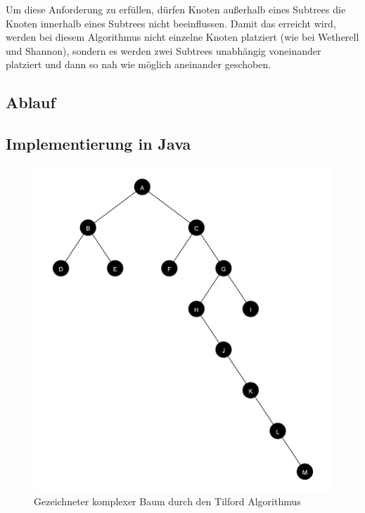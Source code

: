 Um diese Anforderung zu erfüllen, dürfen Knoten außerhalb eines Subtrees die Knoten innerhalb eines Subtrees nicht beeinflussen. 
Damit das erreicht wird, werden bei diesem Algorithmus nicht einzelne Knoten platziert (wie bei Wetherell und Shannon), 
sondern es werden zwei Subtrees unabhängig voneinander platziert und dann so nah wie möglich aneinander geschoben. 

\label{chap:kapitel3_3_Ablauf}
\subsection{Ablauf}

\subsection{Implementierung in Java}

\begin{figure}[H]
    \centering
    \includegraphics[scale = 0.05]{abbildungen/baum_algo_3_n1}
    \caption{Gezeichneter komplexer Baum durch den Tilford Algorithmus}
    \label{pic:baum_algo_3_n1} 
\end{figure}

